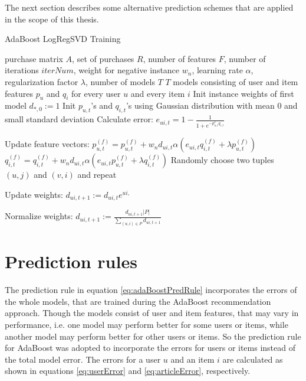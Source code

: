 \documentclass[10pt]{reportMaster}
\begin{document}
The next section describes some alternative prediction schemes that are applied in the scope of this thesis.

\begin{algorithm}
	\caption{AdaBoost LogRegSVD Training}
	\label{alg:AdaBoostLogRegSVDTraining}
	\begin{algorithmic}[1]
		\Require purchase matrix $A$, set of purchases $R$, number of features $F$, number of iterations $iterNum$, weight for negative instance $w_n$, learning rate $\alpha$, regularization factor $\lambda$, number of models $T$
		\Ensure $T$ models consisting of user and item features $p_u$ and $q_i$ for every user $u$ and every item $i$
		\State Init instance weights of first model $d_{*,0} := 1$
				\State Init $p_{u,t}$'s and $q_{i,t}$'s using Gaussian distribution with mean $0$ and small standard deviation
					\State Calculate error:
					\State $e_{ui,t} = 1 - \frac{1}{1 + e^{-p_{u,t}^Tq_{i,t}}}$
					
					\State Update feature vectors:
						\State $p_{u,t}^{(f)} = p_{u,t}^{(f)} + w_n d_{ui,t} \alpha (e_{ui, t} q_{i,t}^{(f)} + \lambda p_{u,t}^{(f)})$
						\State $q_{i,t}^{(f)} = q_{i,t}^{(f)} + w_n d_{ui,t} \alpha (e_{ui, t} p_{u,t}^{(f)} + \lambda q_{i,t}^{(f)})$
					\EndFor	
					\State Randomly choose two tuples $(u,j)$ and $(v,i)$ and repeat
				\EndFor
			\EndFor
			
			\State Update weights:
				\State $d_{ui,t+1} := d_{ui,t} e^{ui,}$
			\EndFor
			
			\State Normalize weights:
			\State $d_{ui,t+1} := \frac{d_{ui,t+1} |P|}{\sum_{(u,i) \in P}{d_{ui, t+1}}}$
			\EndFor 
		\EndFor
		
		
	\end{algorithmic}	
\end{algorithm}


\section{Prediction rules}
\label{sec:predictionRules}

The prediction rule in equation \ref{eq:adaBoostPredRule} incorporates the errors of the whole models, that are trained during the AdaBoost recommendation approach.
Though the models consist of user and item features, that may vary in performance, i.e. one model may perform better for some users or items, while another model may perform better for other users or items.
So the prediction rule for AdaBoost was adopted to incorporate the errors for users or items instead of the total model error.
The errors for a user $u$ and an item $i$ are calculated as shown in equations \ref{eq:userError} and \ref{eq:articleError}, respectively.
\end{document}
